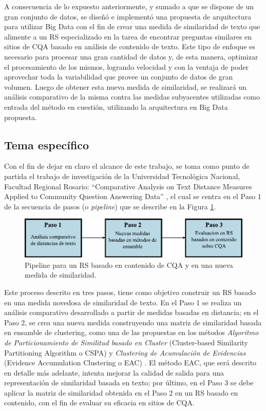 \bigskip A consecuencia de lo expuesto anteriormente, y sumado a que se dispone de un gran conjunto de datos, se diseñó e implementó una propuesta de arquitectura para utilizar Big Data con el fin de crear una medida de similaridad de texto que alimente a un RS especializado en la tarea de encontrar preguntas similares en sitios de CQA basado en análisis de contenido de texto. Este tipo de enfoque es necesario para procesar una gran cantidad de datos y, de esta manera, optimizar el procesamiento de los mismos, logrando velocidad y con la ventaja de poder aprovechar toda la variabilidad que provee un conjunto de datos de gran volumen. Luego de obtener esta nueva medida de similaridad, se realizará un análisis comparativo de la misma contra las medidas subyacentes utilizadas como entrada del método en cuestión, utilizando la arquitectura en Big Data propuesta.

\subsection{Tema específico}
Con el fin de dejar en claro el alcance de este trabajo, se toma como punto de partida el trabajo de investigación de la Universidad Tecnológica Nacional, Facultad Regional Rosario: “Comparative Analysis on Text Distance Measures Applied to Community Question Answering Data” \citep{gonzalez2017comparative}, el cual se centra en el Paso 1 de la secuencia de pasos (o \textit{pipeline}) que se describe en la Figura \ref{fig:pipeline}.
\bigskip
\begin{figure}[h!]
	\centering
	\includegraphics[width=0.9\linewidth]{5_introduccion/imagenes/pipeline}
	\caption{Pipeline para un RS basado en contenido de CQA y en una nueva medida de similaridad.}
	\label{fig:pipeline}
\end{figure}

Este proceso descrito en tres pasos, tiene como objetivo construir un RS basado en una medida novedosa de similaridad de texto. En el Paso 1 se realiza un análisis comparativo desarrollado a partir de medidas basadas en distancia; en el Paso 2, se crea una nueva medida construyendo una matriz de similaridad basada en ensamble de clustering, como una de las propuestas en los métodos \textit{Algoritmo de Particionamiento de Similitud basado en Cluster} (Cluster-based Similarity Partitioning Algorithm o CSPA) \citep{strehl33knowledge} y \textit{Clustering de Acumulación de Evidencias} (Evidence Accumulation Clustering o EAC) \citep{fred2005combining}. El método EAC, que será descrito en detalle más adelante, intenta mejorar la calidad de salida para una representación de similaridad basada en texto; por último, en el Paso 3 se debe aplicar la matriz de similaridad obtenida en el Paso 2 en un RS basado en contenido, con el fin de evaluar su eficacia en sitios de CQA.

